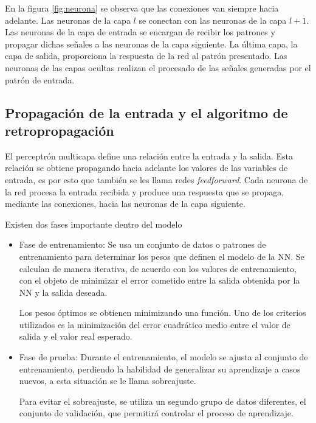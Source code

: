 En la figura \ref{fig:neurona} se observa que las conexiones van siempre hacia adelante. Las neuronas de la capa $l$ se conectan con las neuronas de la capa $l + 1$. Las neuronas de la capa de entrada se encargan de recibir los patrones y propagar dichas señales a las neuronas de la capa siguiente. La última capa, la capa de salida, proporciona la respuesta de la red al patrón presentado. Las neuronas de las capas ocultas realizan el procesado de las señales generadas por el patrón de entrada.

\subsection{Propagación de la entrada y el algoritmo de retropropagación}
El perceptrón multicapa define una relación entre la entrada y la salida. Esta relación se obtiene propagando hacia adelante los valores de las variables de entrada, es por esto que también se les llama redes {\em feedforward}. Cada neurona de la red procesa la entrada recibida y produce una respuesta que se propaga, mediante las conexiones, hacia las neuronas de la capa siguiente.

Existen dos fases importante dentro del modelo
\begin{itemize}
	\item Fase de entrenamiento: Se usa un conjunto de datos o patrones de entrenamiento para determinar los pesos que definen el modelo de la NN. Se calculan de manera iterativa, de acuerdo con los valores de entrenamiento, con el objeto de minimizar el error cometido entre la salida obtenida por la NN y la salida deseada.

	Los pesos óptimos se obtienen minimizando una función. Uno de los criterios utilizados es la minimización del error cuadrático medio entre el valor de salida y el valor real esperado.

	\item Fase de prueba: Durante el entrenamiento, el modelo se ajusta al conjunto de entrenamiento, perdiendo la habilidad de generalizar su aprendizaje a casos nuevos, a esta situación se le llama sobreajuste.

	Para evitar el sobreajuste, se utiliza un segundo grupo de datos diferentes, el conjunto de validación, que permitirá controlar el proceso de aprendizaje.
\end{itemize}


